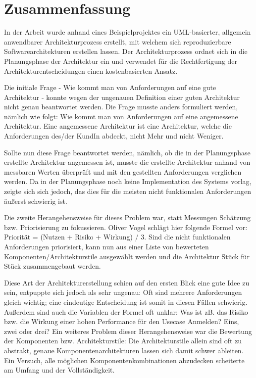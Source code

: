 \chapter{Zusammenfassung}
In der Arbeit wurde anhand eines Beispielprojektes ein UML-basierter, allgemein anwendbarer Architekturprozess erstellt, mit welchem sich reproduzierbare Softwarearchitekturen erstellen lassen. Der Architekturprozess ordnet sich in die Planungsphase der Architektur ein und verwendet für die Rechtfertigung der Architekturentscheidungen einen kostenbasierten Ansatz.

Die initiale Frage - Wie kommt man von Anforderungen auf eine gute Architektur - konnte wegen der ungenauen Definition einer guten Architektur nicht genau beantwortet werden. Die Frage musste anders formuliert werden, nämlich wie folgt: Wie kommt man von Anforderungen auf eine angemessene Architektur. Eine angemessene Architektur ist eine Architektur, welche die Anforderungen des/der KundIn abdeckt, nicht Mehr und nicht Weniger.

Sollte nun diese Frage beantwortet werden, nämlich, ob die in der Planungsphase erstellte Architektur angemessen ist, musste die erstellte Architektur anhand von messbaren Werten überprüft und mit den gestellten Anforderungen verglichen werden. Da in der Planungsphase noch keine Implementation des Systems vorlag, zeigte sich sich jedoch, das dies für die meisten nicht funktionalen Anforderungen äußerst schwierig ist.

Die zweite Herangehensweise für dieses Problem war, statt Messungen Schätzung bzw. Priorisierung zu fokussieren. Oliver Vogel schlägt hier folgende Formel vor: \glqq Priorität = (Nutzen + Risiko + Wirkung) / 3\grqq \cite[S. 374]{softarch}. Sind die nicht funktionalen Anforderungen priorisiert, kann nun aus einer Liste von bewerteten Komponenten/Architekturstile ausgewählt werden \cite[S. 179]{review} und die Architektur Stück für Stück zusammengebaut werden.

Diese Art der Architekturerstellung schien auf den ersten Blick eine gute Idee zu sein, entpuppte sich jedoch als sehr ungenau: Oft sind mehrere Anforderungen gleich wichtig; eine eindeutige Entscheidung ist somit in diesen Fällen schwierig. Außerdem sind auch die Variablen der Formel oft unklar: Was ist zB. das Risiko bzw. die Wirkung einer hohen Performance für den Usecase Anmelden? Eins, zwei oder drei? Ein weiteres Problem dieser Herangehensweise war die Bewertung der Komponenten bzw. Architekturstile: Die Architekturstile allein sind oft zu abstrakt, genaue Komponentenarchitekturen lassen sich damit schwer ableiten. Ein Versuch, alle möglichen Komponentenkombinationen abzudecken scheiterte am Umfang und der Vollständigkeit.

